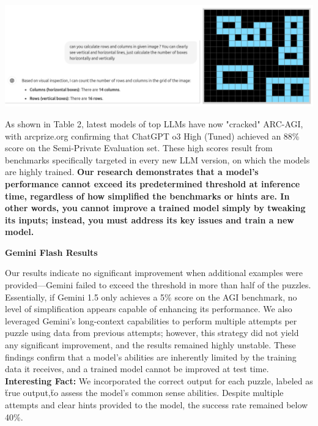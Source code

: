 \documentclass[11pt]{scrartcl}
\begin{document}
\vspace{1cm}

\includegraphics[width=0.99\linewidth, center]{arcagi_1.png}

\vspace{0.5cm}

As shown in Table 2, latest models of top LLMs have now "cracked" ARC-AGI, with arcprize.org confirming that ChatGPT o3 High (Tuned) achieved an 88\% score on the Semi-Private Evaluation set. These high scores result from benchmarks specifically targeted in every new LLM version, on which the models are highly trained. \textbf{Our research demonstrates that a model’s performance cannot exceed its predetermined threshold at inference time, regardless of how simplified the benchmarks or hints are. In other words, you cannot improve a trained model simply by tweaking its inputs; instead, you must address its key issues and train a new model.} \\

\begin{small}
\textbf{Gemini Flash Results} \\
\end{small}
Our results indicate no significant improvement when additional examples were provided—Gemini failed to exceed the threshold in more than half of the puzzles. Essentially, if Gemini 1.5 only achieves a 5\% score on the AGI benchmark, no level of simplification appears capable of enhancing its performance. We also leveraged Gemini's long-context capabilities to perform multiple attempts per puzzle using data from previous attempts; however, this strategy did not yield any significant improvement, and the results remained highly unstable. These findings confirm that a model's abilities are inherently limited by the training data it receives, and a trained model cannot be improved at test time.\\

\textbf{Interesting Fact:} We incorporated the correct output for each puzzle, labeled as \"true output,\" to assess the model's common sense abilities. Despite multiple attempts and clear hints provided to the model, the success rate remained below 40\%. \\
\end{document}
